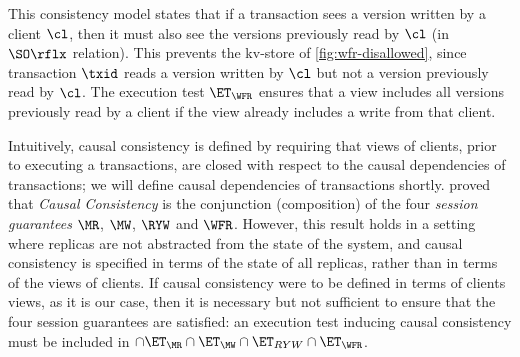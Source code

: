 This consistency model states that if a transaction sees a version written by a
client $\cl$, then it must also see the versions previously read by $\cl$ (in $\SO\rflx$ relation).
This prevents the kv-store of \cref{fig:wfr-disallowed},
since transaction $\txid$ reads a version written by $\cl$ but
not a version previously read by $\cl$.
The execution test $\ET_{\WFR}$ ensures
that a view includes all versions previously read by a client 
if the view already includes a write from that client. 

Intuitively, causal consistency is defined by requiring that views of clients, 
prior to executing a transactions, are closed with respect to the causal dependencies 
of transactions; we will define causal dependencies of transactions shortly.
 proved that \emph{Causal Consistency} 
is the conjunction (composition) of the four \emph{session guarantees} \(\MR\), \(\MW\), \(\RYW\) and \(\WFR\). 
However, this result holds in a setting where replicas are not abstracted from the state of the system, and 
causal consistency is specified in terms of the state of all replicas, rather than in terms of the views of clients. 
If causal consistency were to be defined in terms of clients views, as it is our case, then it is necessary but not sufficient to 
ensure that the four session guarantees are satisfied: an execution test inducing causal consistency must 
be included in $\cap \ET_{\MR} \cap \ET_{\MW} \cap \ET_{RYW} \cap \ET_{\WFR}$.

